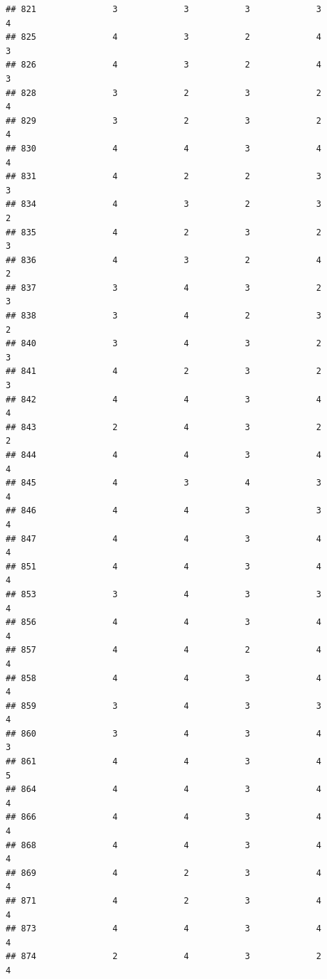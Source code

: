 \documentclass[
]{article}
\begin{document}
\begin{verbatim}
## 821               3             3           3             3            4
## 825               4             3           2             4            3
## 826               4             3           2             4            3
## 828               3             2           3             2            4
## 829               3             2           3             2            4
## 830               4             4           3             4            4
## 831               4             2           2             3            3
## 834               4             3           2             3            2
## 835               4             2           3             2            3
## 836               4             3           2             4            2
## 837               3             4           3             2            3
## 838               3             4           2             3            2
## 840               3             4           3             2            3
## 841               4             2           3             2            3
## 842               4             4           3             4            4
## 843               2             4           3             2            2
## 844               4             4           3             4            4
## 845               4             3           4             3            4
## 846               4             4           3             3            4
## 847               4             4           3             4            4
## 851               4             4           3             4            4
## 853               3             4           3             3            4
## 856               4             4           3             4            4
## 857               4             4           2             4            4
## 858               4             4           3             4            4
## 859               3             4           3             3            4
## 860               3             4           3             4            3
## 861               4             4           3             4            5
## 864               4             4           3             4            4
## 866               4             4           3             4            4
## 868               4             4           3             4            4
## 869               4             2           3             4            4
## 871               4             2           3             4            4
## 873               4             4           3             4            4
## 874               2             4           3             2            4

\end{verbatim}
\end{document}
